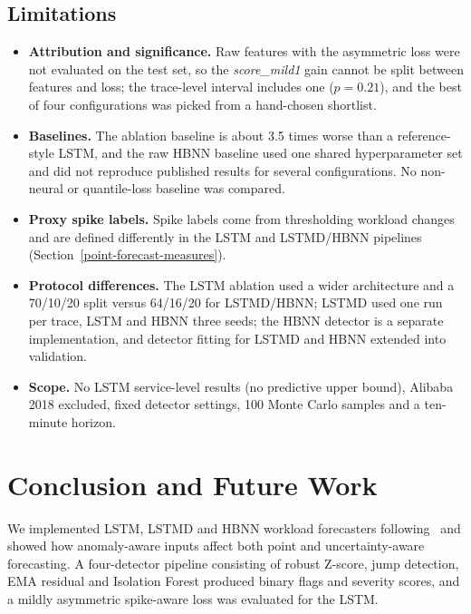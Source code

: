 \documentclass[conference]{IEEEtran}
\begin{document}
\subsection{Limitations}\label{limitations}

\begin{itemize}
\item \textbf{Attribution and significance.} Raw features with the asymmetric
loss were not evaluated on the test set, so the \emph{score\_mild1} gain cannot be
split between features and loss; the trace-level interval includes one
($p=0.21$), and the best of four configurations was picked from a
hand-chosen shortlist.
\item \textbf{Baselines.} The ablation baseline is about 3.5 times worse than a
reference-style LSTM, and the raw HBNN baseline used one shared hyperparameter
set and did not reproduce published results for several configurations. No
non-neural or quantile-loss baseline was compared.
\item \textbf{Proxy spike labels.} Spike labels come from thresholding
workload changes and are defined differently in the LSTM and LSTMD/HBNN
pipelines (Section~\ref{point-forecast-measures}).
\item \textbf{Protocol differences.} The LSTM ablation used a wider architecture
and a 70/10/20 split versus 64/16/20 for LSTMD/HBNN; LSTMD used one run per trace,
LSTM and HBNN three seeds; the HBNN detector is a separate implementation, and
detector fitting for LSTMD and HBNN extended into validation.
\item \textbf{Scope.} No LSTM service-level results (no predictive upper bound),
Alibaba 2018 excluded, fixed detector settings, 100 Monte Carlo samples and a
ten-minute horizon.
\end{itemize}

\section{Conclusion and Future Work}\label{conclusion-and-future-work}

We implemented LSTM, LSTMD and HBNN workload forecasters following~\cite{ref1}
and showed how anomaly-aware inputs affect both point and uncertainty-aware
forecasting. A four-detector pipeline consisting of robust Z-score, jump detection, EMA
residual and Isolation Forest produced binary flags and severity scores, and a
mildly asymmetric spike-aware loss was evaluated for the LSTM.
\end{document}
